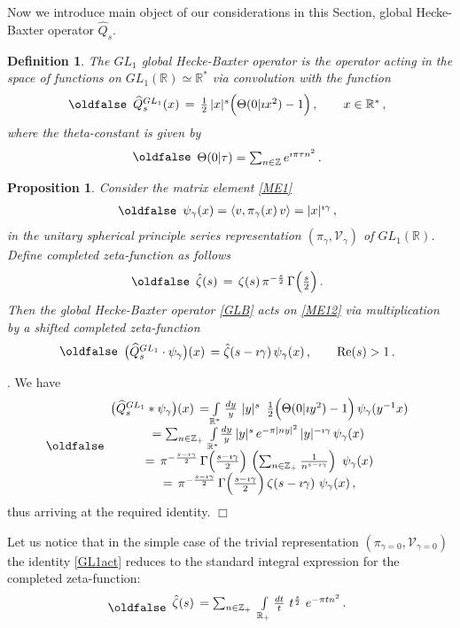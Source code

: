 \documentclass[12pt]{article}
\def\IR{\mathbb{R}}
\def\IZ{\mathbb{Z}}
\def\CV {\mathcal{V}}
\def\g {{\gamma}}
\def\wh{\widehat}
\def\<{\langle}
\def\>{\rangle}
\newtheorem{de}{Definition}[section]
\newtheorem{prop}{Proposition}[section]           %
\newcommand{\proof}{\noindent {\it Proof}. }
\def\be{\begin{eqnarray}\new\begin{array}{cc}}
\def\ee{\end{array}\end{eqnarray}}
\newcounter{pac}[section]
\begin{document}
Now we introduce  main object of our considerations in this Section,
global Hecke-Baxter operator $\wh{Q}_s$.

\begin{de} The $GL_1$ global Hecke-Baxter operator is the operator
  acting in the space of functions on
  $GL_1(\IR)\simeq \IR^*$ via convolution with the   function
 \be\label{GLB}
  \wh{Q}^{GL_1}_s(x)\,
  =\,\frac{1}{2}\,|x|^s\Big(\Theta(0|\imath
  x^2)-1\Big)\,,\qquad x\in \IR^*\,,
\ee
where the theta-constant is given by
 \be
  \Theta(0|\tau)=\sum_{n\in \IZ} e^{\imath \pi \tau n^2}\,.
 \ee
\end{de}


\begin{prop}  Consider the  matrix element \eqref{ME1}
 \be \label{ME12}
  \psi_{\gamma}(x)=\<v,\pi_{\gamma}(x)\,v\>=|x|^{\imath \gamma}\,,
 \ee
in the unitary spherical principle series representation
$(\pi_\gamma,\CV_\gamma)$ of
$GL_1(\IR)$. Define  completed zeta-function as follows
 \be\label{ExtRM}
  \hat{\zeta}(s)\,=\,\zeta(s)\,\pi^{-\frac{s}{2}}\,\Gamma\Big(\frac{s}{2}\Big)\,.
 \ee
Then the global Hecke-Baxter operator \eqref{GLB} acts on \eqref{ME12}
via multiplication by a shifted completed zeta-function
 \be\label{GL1act}
  \bigl(\wh{Q}^{GL_1}_s\cdot \psi_\gamma\bigr)(x)\,
  =\hat{\zeta}(s-\imath \gamma)\,\psi_\gamma(x)\,,\qquad{\rm Re}(s)>1\,.
 \ee
\end{prop}

\proof We have
 \be
  \bigl(\wh{Q}^{GL_1}_s*\psi_\gamma\bigr)(x)\,
  =\!\int\limits_{\IR^*}\frac{dy}{y}\,\, |y|^{s}\,\,\,\frac{1}{2}\Big(
  \Theta(0|\imath  y^2)-1\Big)\,\psi_\gamma(y^{-1}x)\\
  =\sum_{n\in \IZ_+}\,\int\limits_{\IR^*}\!\frac{dy}{y}\,|y|^{s}\,e^{-\pi |ny|^2}\,
  |y|^{-\imath \gamma}\,\psi_\gamma(x)\,\\
  =\,\pi^{-\frac{s-\imath \gamma}{2}}\,\Gamma\Big(\frac{s-\imath \gamma}{2}\Big)\,
  \left(\sum_{n\in \IZ_+} \frac{1}{n^{s-\imath
        \gamma}}\right)\,\,\psi_\gamma(x)\\
        =\,\pi^{-\frac{s-\imath \gamma}{2}}\,\Gamma\Big(\frac{s-\imath \gamma}{2}\Big)\,
  \zeta(s-\imath \gamma)\,\,\psi_\gamma(x)\,,
\ee
thus arriving at the required identity. $\Box$

Let us notice that in the simple case of the trivial representation
$(\pi_{\g=0},\CV_{\gamma=0})$ the identity
\eqref{GL1act} reduces to the standard
integral expression for the completed zeta-function:
 \be
  \hat{\zeta}(s)\,
  =\sum_{n\in \IZ_+}\,\,\int\limits_{\IR_+}\frac{dt}{t}\,\,
  t^{\frac{s}{2}}\,\,e^{-\pi tn^2}\,.
 \ee
\end{document}
